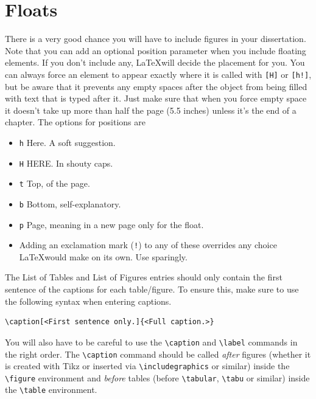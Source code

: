 \section{Floats}
There is a very good chance you will have to include figures in your dissertation. Note that you can add an optional position parameter when you include floating elements. If you don't include any, \LaTeX will decide the placement for you. You can always force an element to appear exactly where it is called with \texttt{[H]} or \texttt{[h!]}, but be aware that it prevents any empty spaces after the object from being filled with text that is typed after it. Just make sure that when you force empty space it doesn't take up more than half the page (5.5 inches) unless it's the end of a chapter. The options for positions are 
\begin{itemize}
\item \texttt{h} Here. A soft suggestion.
\item \texttt{H} HERE. In shouty caps.
\item \texttt{t} Top, of the page.
\item \texttt{b} Bottom, self-explanatory.
\item \texttt{p} Page, meaning in a new page only for the float.
\item Adding an exclamation mark (\texttt{!}) to any of these overrides any choice \LaTeX would make on its own. Use sparingly.
\end{itemize}

The List of Tables and List of Figures entries should only contain the first sentence of the captions for each table/figure. To ensure this, make sure to use the following syntax when entering captions.
\begin{lstlisting}
\caption[<First sentence only.]{<Full caption.>}
\end{lstlisting}

\begin{sloppypar}
You will also have to be careful to use the \verb|\caption| and \verb|\label| commands in the right order. The \verb|\caption| command should be called \textit{after} figures (whether it is created with Tikz or inserted via \verb|\includegraphics| or similar) inside the \verb|\figure| environment and \textit{before} tables (before \verb|\tabular|, \verb|\tabu| or similar) inside the \verb|\table| environment.
\end{sloppypar}

